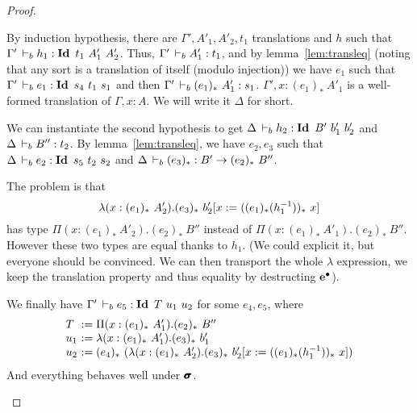 \documentclass[a4paper,english]{lipics-utf8x}
\begin{document}
\begin{proof}
\begin{caselist}
      \nextcase
      \begin{mathc}
      \end{mathc}
      By induction hypothesis, there are $\Gamma',A'_1,A'_2,t_1$ translations
      and $h$ such that $\Gamma' \,\vdash_b h_1 : \operatorname{\mathbf{Id}~} t_1\ A'_1\ A'_2$.
      Thus, $\Gamma' \,\vdash_b A'_1 : t_1$, and by lemma~\ref{lem:transleq}
      (noting that any sort is a translation of itself (modulo injection))
      we have $e_1$ such that $\Gamma' \,\vdash_b e_1 : \operatorname{\mathbf{Id}~} s_4\ t_1\ s_1$ and
      then $\Gamma' \,\vdash_b (e_1)_*\ A'_1 : s_1$.
      $\Gamma', x : (e_1)_*\ A'_1$ is a well-formed translation of
      $\Gamma, x:A$. We will write it $\Delta$ for short.

      We can instantiate the second hypothesis to get
      $\Delta \,\vdash_b h_2 : \operatorname{\mathbf{Id}~} B'\ b'_1\ b'_2$ and $\Delta \,\vdash_b B'' : t_2$.
      By lemma~\ref{lem:transleq}, we have $e_2,e_3$ such that
      $\Delta \,\vdash_b e_2 : \operatorname{\mathbf{Id}~} s_5\ t_2\ s_2$ and
      $\Delta \,\vdash_b (e_3)_* : B' \to (e_2)_*\ B''$.

      The problem is that
      \[
        \lambda (x : (e_1)_*\ A'_2). (e_3)_*\ %
        b'_2[x := ((e_1)_* (h_1\inv))_*\ x]
      \]
      has type
      $\Pi (x : (e_1)_*\ A'_2). (e_2)_*\ B''$ instead of
      $\Pi (x : (e_1)_*\ A'_1). (e_2)_*\ B''$.
      However these two types are equal thanks to $h_1$.
      (We could explicit it, but everyone should be convinced. We can then
      transport the whole $\lambda$ expression, we keep the translation
      property and thus equality by destructing $\operatorname{\operatorname{\mathbf{e}}^\bullet}$).

      We finally have
      $\Gamma' \,\vdash_b e_5 : \operatorname{\mathbf{Id}~} T\ u_1\ u_2$ for some $e_4,e_5$,
      where
      \[
        \begin{array}{l@{~}l}
          T   &:= \Pi (x : (e_1)_*\ A'_1). (e_2)_*\ B'' \\
          u_1 &:= \lambda (x : (e_1)_*\ A'_1). (e_3)_*\ b'_1 \\
          u_2 &:= (e_4)_*\ %
                   (\lambda (x : (e_1)_*\ A'_2).
                    (e_3)_*\ b'_2[x := ((e_1)_* (h_1\inv))_*\ x])
        \end{array}
      \]
      And everything behaves well under $\operatorname{\pmb{\bm{\sigma}}}$.


\end{caselist}
\end{proof}
\end{document}
